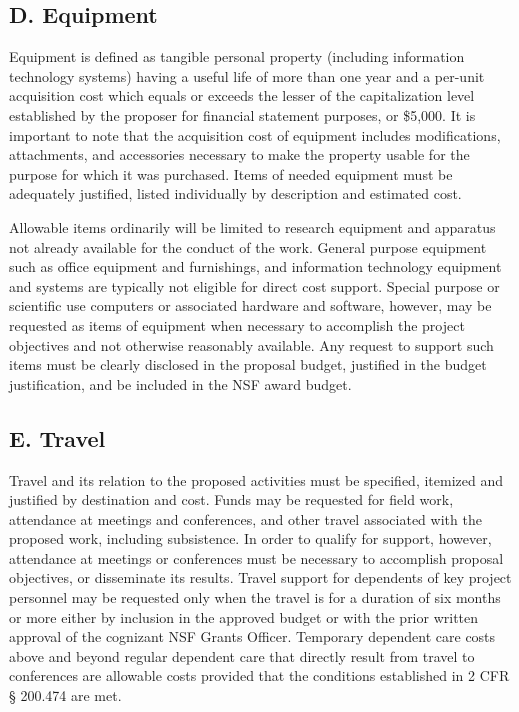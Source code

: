 \subsection*{D. Equipment}
Equipment is defined as tangible personal property (including
information technology systems) having a useful life of more than one
year and a per-unit acquisition cost which equals or exceeds the
lesser of the capitalization level established by the proposer for
financial statement purposes, or \$5,000. It is important to note that
the acquisition cost of equipment includes modifications, attachments,
and accessories necessary to make the property usable for the purpose
for which it was purchased. Items of needed equipment must be
adequately justified, listed individually by description and estimated
cost.

Allowable items ordinarily will be limited to research equipment and
apparatus not already available for the conduct of the work. General
purpose equipment such as office equipment and furnishings, and
information technology equipment and systems are typically not
eligible for direct cost support. Special purpose or scientific use
computers or associated hardware and software, however, may be
requested as items of equipment when necessary to accomplish the
project objectives and not otherwise reasonably available. Any request
to support such items must be clearly disclosed in the proposal
budget, justified in the budget justification, and be included in the
NSF award budget.

\subsection*{E. Travel}
Travel and its relation to the proposed activities must be specified,
itemized and justified by destination and cost. Funds may be requested
for field work, attendance at meetings and conferences, and other
travel associated with the proposed work, including subsistence. In
order to qualify for support, however, attendance at meetings or
conferences must be necessary to accomplish proposal objectives, or
disseminate its results. Travel support for dependents of key project
personnel may be requested only when the travel is for a duration of
six months or more either by inclusion in the approved budget or with
the prior written approval of the cognizant NSF Grants
Officer. Temporary dependent care costs above and beyond regular
dependent care that directly result from travel to conferences are
allowable costs provided that the conditions established in 2 CFR \S
200.474 are met.

